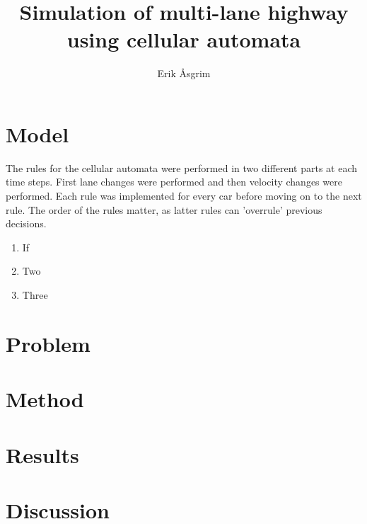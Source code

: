 \documentclass[a4paper,12pt]{article}
\title{Simulation of multi-lane highway using cellular automata}
\author{Erik Åsgrim}
\begin{document}
\maketitle

\section*{Model}
The rules for the cellular automata were performed in two different parts at each time steps.
First lane changes were performed and then velocity changes were performed. Each rule was implemented for every car before
moving on to the next rule. The order of the rules matter, as latter rules can 'overrule' previous decisions.

\begin{enumerate}
    \item If 
    \item Two
    \item Three
\end{enumerate}

\section*{Problem}

\section*{Method}

\section*{Results}

\section*{Discussion}
\end{document}
